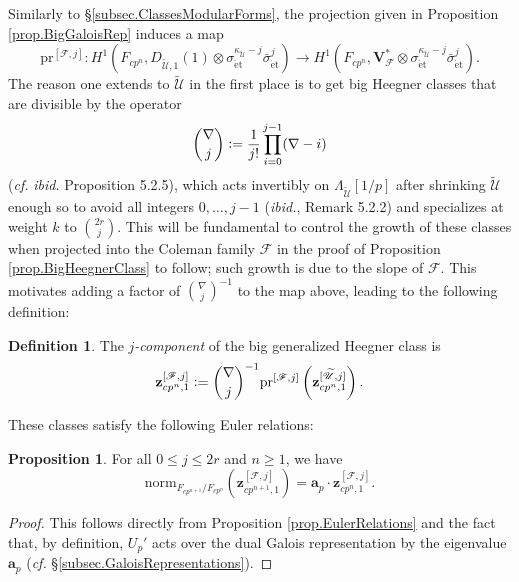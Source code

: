 \documentclass[a4paper]{amsart}
\numberwithin{equation}{section}
\theoremstyle{definition}
\newtheorem{proposition}[theorem]{Proposition}
\newtheorem{definition}[theorem]{Definition}
\newcommand{\defeq}{\vcentcolon=}
\DeclareMathOperator{\et}{\text{\'et}}
\newcommand{\norm}{\mathrm{norm}}
\renewcommand{\et}{\mathrm{\acute{e}t}}
\begin{document}
Similarly to \S\ref{subsec.ClassesModularForms}, the projection given in Proposition \ref{prop.BigGaloisRep} induces a map
\begin{equation}\label{eq.ProjectionBigGaloisRep}
\mathrm{pr}^{[\mathscr{F},j]}\colon H^1\left(F_{cp^n},D_{\widetilde{\mathscr{U}},1}(1)\otimes\sigma^{\kappa_{\widetilde{\mathscr{U}}}-j}_{\et}\bar{\sigma}^{j}_{\et}\right)\longrightarrow H^1\left(F_{cp^n},\mathbf{V}_{\mathscr{F}}^\ast\otimes\sigma_{\et}^{\kappa_{\widetilde{\mathscr{U}}}-j}\bar\sigma^j_{\et}\right).
\end{equation}
The reason one extends to $\widetilde{\mathscr{U}}$ in the first place is to get big Heegner classes that are divisible by the operator \[\binom{\nabla}{j}\defeq\dfrac{1}{j!}\prod_{i=0}^{j-1}(\nabla-i)\]   (\textit{cf.} \textit{ibid.} Proposition 5.2.5), which acts invertibly on $\Lambda_{\widetilde{\mathscr{U}}}[1/p]$ after shrinking $\widetilde{\mathscr{U}}$ enough so to avoid all integers $0,\dots,j-1$ (\textit{ibid.}, Remark 5.2.2) and specializes at weight $k$ to $\binom{2r}{j}$. This will be fundamental to control the growth of these classes when projected into the Coleman family $\mathscr{F}$ in the proof of Proposition \ref{prop.BigHeegnerClass} to follow; such growth is due to the slope of $\mathscr{F}$. This motivates adding a factor of $\binom{\nabla}{j}^{-1}$ to the map above, leading to the following definition:

\begin{definition}
The \emph{$j$-component} of the big generalized Heegner class is 
\[\mathbf{z}^{[\mathscr{F},j]}_{cp^n,1}\defeq\binom{\nabla}{j}^{-1}\mathrm{pr}^{[\mathscr{F},j]}\left(\mathbf{z}^{[\widetilde{\mathscr{U}},j]}_{cp^n,1}\right).\]
\end{definition}

These classes satisfy the following Euler relations:

\begin{proposition}\label{prop.EulerRelationsBig}
For all $0\le j\le 2r$ and $n\ge 1$, we have \[\norm_{F_{cp^{n+1}}/F_{cp^{n}}}\left(\mathbf{z}^{[\mathscr{F},j]}_{cp^{n+1},1}\right)=\mathbf{a}_p\cdot\mathbf{z}^{[\mathscr{F},j]}_{cp^n,1}.\]
\end{proposition}
\begin{proof}
This follows directly from Proposition \ref{prop.EulerRelations} and the fact that, by definition, $U_p'$ acts over the dual Galois representation by the eigenvalue $\mathbf{a}_p$ (\textit{cf.} \S\ref{subsec.GaloisRepresentations}).
\end{proof}
\end{document}
